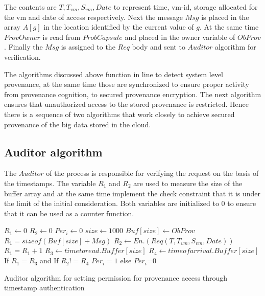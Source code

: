 \documentclass[conference]{IEEEtran}
\begin{document}
The contents are $T,T_{vm},S_{vm},Date$ to represent time, vm-id, storage allocated for the vm and date of access respectively. Next the message $Msg$ is placed in the array $A[g]$ in the location identified by the current value of $g$. At the same time $ProvOwner$ is read from $ProbCapsule$ and placed in the owner variable of $ObProv$. Finally the $Msg$ is assigned to the $Req$ body and sent to $Auditor$ algorithm for verification.

The algorithms discussed above function in line to detect system level provenance, at the same time those are synchronized to ensure proper activity from provenance cognition, to secured provenance encryption. The next algorithm ensures that unauthorized access to the stored provenance is restricted. Hence there is a sequence of two algorithms that work closely to achieve secured provenance of the big data stored in the cloud.



\subsection{Auditor algorithm}

The $Auditor$ of the process is responsible for verifying the request on the basis of the timestamps. The variable $R_1$ and $R_2$ are used to measure the size of the buffer array and at the same time implement the check constraint that it is under the limit of the initial consideration. Both variables are initialized to 0 to ensure that it can be used as a counter function.


\begin{algorithm}
 \begin{algorithmic}[1]
 \State $R_1\gets0$
 \State $R_2\gets0$
 \State $Per_i\gets0$
 \State $size\gets1000$
 \State $Buf[size]\gets ObProv$
 \State $R_1=sizeof(Buf[size]+Msg)$
 \State $R_2 \gets En.(Req(T, T_{vm}, S_{vm}, Date))$
 \State $R_1=R_1+1$
\EndWhile
 \EndWhile
 \State $R_3\gets timetoread.Buffer[size]$
 \State $R_4\gets timeof arrival.Buffer[size]$
 \State If $R_1=R_3$ and
 \State If $R_2!=R_4$
 \State $Per_i=1$
 \State else $Per_i$=0
 \EndWhile
 \EndWhile
\EndProcedure
 \end{algorithmic}
 \caption{Auditor algorithm for setting permission for provenance access through timestamp authentication}
 \label{euclid}
\end{algorithm}
\end{document}
